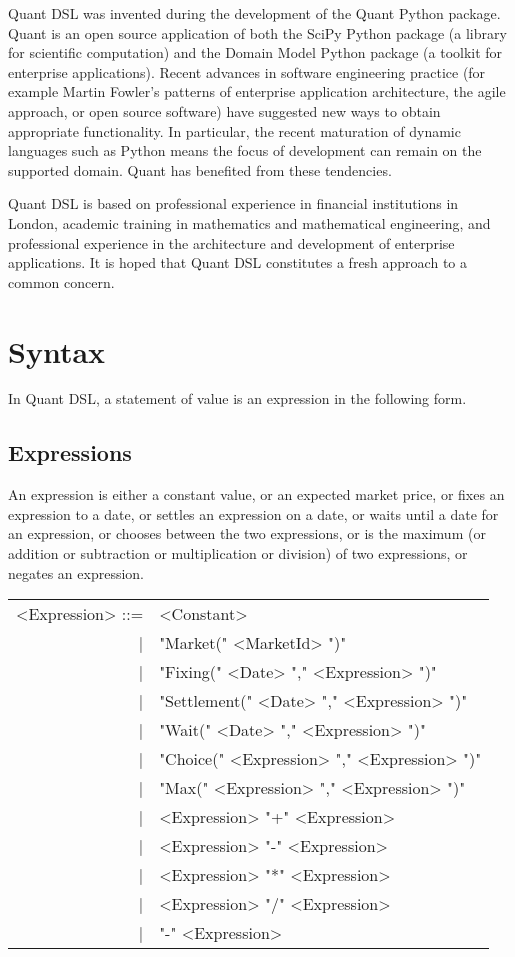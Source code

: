 \documentclass[a4paper,11pt]{article}
\begin{document}
Quant DSL was invented during the development of the Quant Python package. Quant is an open source application of both the SciPy Python package (a library for scientific computation) and the Domain Model Python package (a toolkit for enterprise applications). Recent advances in software engineering practice (for example Martin Fowler's patterns of enterprise application architecture, the agile approach, or open source software) have suggested new ways to obtain appropriate functionality. In particular, the recent maturation of dynamic languages such as Python means the focus of development can remain on the supported domain. Quant has benefited from these tendencies.

Quant DSL is based on professional experience in financial institutions in London, academic training in mathematics and mathematical engineering, and professional experience in the architecture and development of enterprise applications. It is hoped that Quant DSL constitutes a fresh approach to a common concern.

\section{Syntax}

In Quant DSL, a statement of value is an expression in the following form.

\subsection{Expressions}

An expression is either a constant value, or an expected market price, or fixes an expression to a date, or settles an expression on a date, or waits until a date for an expression, or chooses between the two expressions, or is the maximum (or addition or subtraction or multiplication or division) of two expressions, or negates an expression.

\begin{tabular}{rl}
\\
<Expression> ::= & <Constant> \\
          | & "Market(" <MarketId> ")" \\
          | & "Fixing(" <Date> "," <Expression> ")" \\
          | & "Settlement(" <Date> "," <Expression> ")" \\
          | & "Wait(" <Date> "," <Expression> ")" \\
          | & "Choice(" <Expression> "," <Expression> ")" \\
          | & "Max(" <Expression> "," <Expression> ")" \\
          | & <Expression> "+" <Expression> \\
          | & <Expression> "-" <Expression> \\
          | & <Expression> "*" <Expression> \\
          | & <Expression> "/" <Expression> \\
          | & "-" <Expression> \\
\end{tabular}
\end{document}
